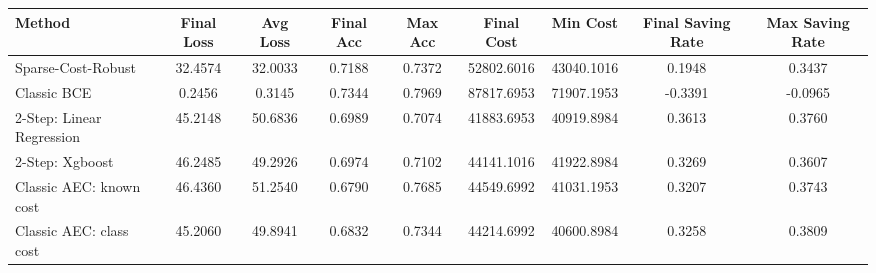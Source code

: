 \begin{tabular}{lcccccccc}
\toprule
Method & Final Loss & Avg Loss & Final Acc & Max Acc & Final Cost & Min Cost & Final Saving Rate & Max Saving Rate \\
\midrule
Sparse-Cost-Robust & 32.4574 & 32.0033 & 0.7188 & 0.7372 & 52802.6016 & 43040.1016 & 0.1948 & 0.3437 \\
Classic BCE & 0.2456 & 0.3145 & 0.7344 & 0.7969 & 87817.6953 & 71907.1953 & -0.3391 & -0.0965 \\
2-Step: Linear Regression & 45.2148 & 50.6836 & 0.6989 & 0.7074 & 41883.6953 & 40919.8984 & 0.3613 & 0.3760 \\
2-Step: Xgboost & 46.2485 & 49.2926 & 0.6974 & 0.7102 & 44141.1016 & 41922.8984 & 0.3269 & 0.3607 \\
Classic AEC: known cost & 46.4360 & 51.2540 & 0.6790 & 0.7685 & 44549.6992 & 41031.1953 & 0.3207 & 0.3743 \\
Classic AEC: class cost & 45.2060 & 49.8941 & 0.6832 & 0.7344 & 44214.6992 & 40600.8984 & 0.3258 & 0.3809 \\
\bottomrule
\end{tabular}
